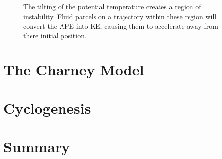 \documentclass{article}
\begin{document}
\begin{figure}[hb]
  \centering
  
  \caption{The tilting of the potential temperature creates a region of instability. Fluid parcels on a trajectory within these region will convert the APE into KE, causing them to accelerate away from there initial position. }
  \label{pedloskyexample}
\end{figure}

\section{The Charney Model}
\cite{Hoskins2013}
\section{Cyclogenesis} 

\section{Summary}


\end{document}
